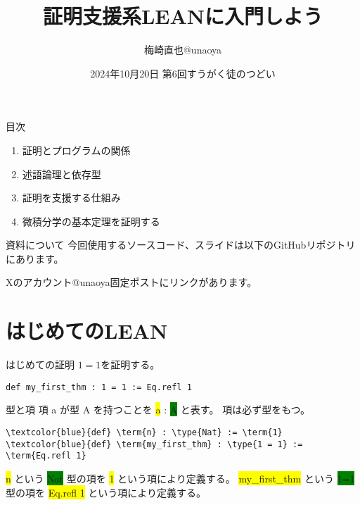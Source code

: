 \documentclass[unicode,12pt]{beamer}%
\title{証明支援系LEANに入門しよう}
\author{梅崎直也@unaoya}
\date{2024年10月20日 第6回すうがく徒のつどい}
\newcommand{\type}[1]{\colorbox{green}{#1}}
\newcommand{\term}[1]{\colorbox{yellow}{#1}}
\begin{document}
\begin{frame}
  \maketitle
\end{frame}

\begin{frame}{目次}
  \begin{enumerate}
    \item 証明とプログラムの関係
    \item 述語論理と依存型
    \item 証明を支援する仕組み
    \item 微積分学の基本定理を証明する
  \end{enumerate}
\end{frame}

\begin{frame}{資料について}
  今回使用するソースコード、スライドは以下のGitHubリポジトリにあります。

  Xのアカウント@unaoya固定ポストにリンクがあります。
\end{frame}

\section{はじめてのLEAN}

\begin{frame}[fragile]{はじめての証明}
  $1=1$を証明する。

  \begin{tcolorbox}[title=FirstTheorem.lean]
  \setlength{\baselineskip}{12pt}
  \begin{Verbatim}[commandchars=\\\{\}]
def my_first_thm : 1 = 1 := Eq.refl 1
  \end{Verbatim}
  \end{tcolorbox}
\end{frame}

\begin{frame}[fragile]{型と項}
  項 a が型 A を持つことを \term{a} : \type{A} と表す。
  項は必ず型をもつ。
  
  \pause

  \begin{tcolorbox}[title=FirstTheorem.lean]
  \setlength{\baselineskip}{12pt}
  \begin{Verbatim}[commandchars=\\\{\}, baselinestretch=1.5]
\textcolor{blue}{def} \term{n} : \type{Nat} := \term{1}    
\textcolor{blue}{def} \term{my_first_thm} : \type{1 = 1} := \term{Eq.refl 1}    
  \end{Verbatim}
  \end{tcolorbox}  

  \term{n} という \type{Nat} 型の項を \term{1} という項により定義する。
  \term{my\_first\_thm} という \type{1=1} 型の項を \term{Eq.refl 1} という項により定義する。
\end{frame}
\end{document}
